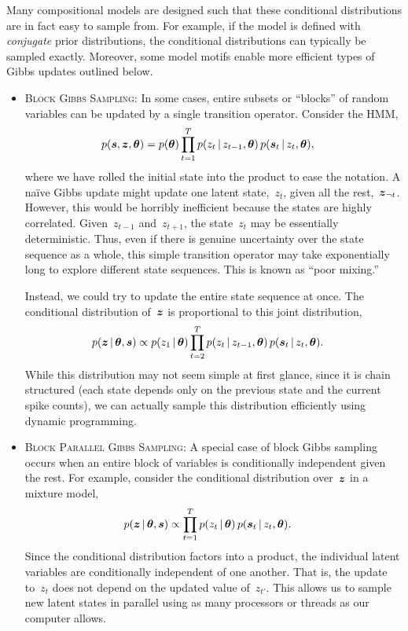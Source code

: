 Many compositional models are designed such that these conditional 
distributions are in fact easy to sample from. For example, if the 
model is defined with \emph{conjugate} prior distributions, the conditional
distributions can typically be sampled exactly. Moreover, some model 
motifs enable more efficient types of Gibbs updates outlined below.

\begin{itemize}
\item \textsc{Block Gibbs Sampling}:
  In some cases, entire subsets or ``blocks'' of random variables can 
  be updated by a single transition operator. Consider the HMM,
  \begin{align*}
    p(\boldsymbol{s}, \boldsymbol{z}, \boldsymbol{\theta}) 
    &= p(\boldsymbol{\theta})
      \prod_{t=1}^T p(z_t \,|\, z_{t-1}, \boldsymbol{\theta}) \, 
      p(\boldsymbol{s}_t \,|\, z_t, \boldsymbol{\theta}),
  \end{align*}
  where we have rolled the initial state into the product to ease the 
  notation. A na\"ive Gibbs update might update one latent state,~$z_t$,
  given all the rest,~$\boldsymbol{z}_{\neg t}$. However, this would be horribly 
  inefficient because the states are highly correlated. Given~$z_{t-1}$
  and~$z_{t+1}$, the state~$z_t$ may be essentially deterministic. Thus,
  even if there is genuine uncertainty over the state sequence as a whole,
  this simple transition operator may take exponentially long to explore 
  different state sequences. This is known as ``poor mixing.''

  Instead, we could try to update the entire state sequence at once. 
  The conditional distribution of~$\boldsymbol{z}$ is proportional to this joint 
  distribution,
  \begin{align*}
    p(\boldsymbol{z} \,|\, \boldsymbol{\theta}, \boldsymbol{s}) 
    &\propto p(z_1 \,|\, \boldsymbol{\theta}) \prod_{t=2}^T p(z_t \,|\, z_{t-1}, \boldsymbol{\theta}) \, 
      p(\boldsymbol{s}_t \,|\, z_t, \boldsymbol{\theta}).
  \end{align*}
  While this distribution may not seem simple at first glance, since it 
  is chain structured (each state depends only on the previous state and 
  the current spike counts), we can actually sample this distribution 
  efficiently using dynamic programming.
  
\item \textsc{Block Parallel Gibbs Sampling}:
  A special case of block Gibbs sampling occurs when an entire block 
  of variables is conditionally independent given the rest. For example,
  consider the conditional distribution over~$\boldsymbol{z}$ in a mixture model,
  \begin{align*}
    p(\boldsymbol{z} \,|\, \boldsymbol{\theta}, \boldsymbol{s}) 
    &\propto \prod_{t=1}^T p(z_t \,|\, \boldsymbol{\theta}) \,
      p(\boldsymbol{s}_t \,|\, z_t, \boldsymbol{\theta}).
  \end{align*}
  Since the conditional distribution factors into a product, the individual
  latent variables are conditionally independent of one another. That is, the 
  update to~$z_t$ does not depend on the updated value of~$z_{t'}$. This 
  allows us to sample new latent states in parallel using as many processors
  or threads as our computer allows.


\end{itemize}
